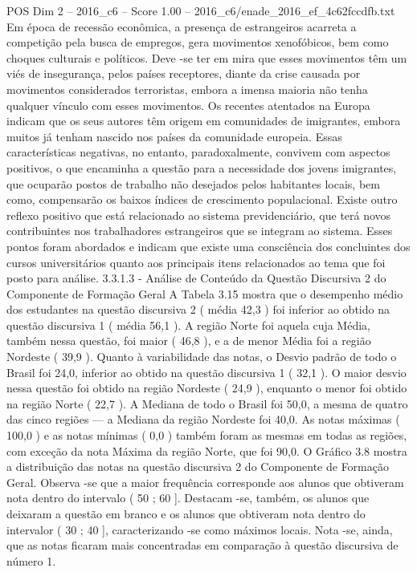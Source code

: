 \begin{textsample}{POS Dim 2 – 2016\_c6 – Score 1.00 – 2016\_c6/enade\_2016\_ef\_4c62fccdfb.txt}
Em época de recessão econômica, a presença de estrangeiros acarreta a competição pela busca de empregos, gera movimentos xenofóbicos, bem como choques culturais e políticos.
Deve -se ter em mira que esses movimentos têm um viés de insegurança, pelos países receptores, diante da crise causada por movimentos considerados terroristas, embora a imensa maioria não tenha qualquer vínculo com esses movimentos.
Os recentes atentados na Europa indicam que os seus autores têm origem em comunidades de imigrantes, embora muitos já tenham nascido nos países da comunidade europeia.
Essas características negativas, no entanto, paradoxalmente, convivem com aspectos positivos, o que encaminha a questão para a necessidade dos jovens imigrantes, que ocuparão postos de trabalho não desejados pelos habitantes locais, bem como, compensarão os baixos índices de crescimento populacional.
Existe outro reflexo positivo que está relacionado ao sistema previdenciário, que terá novos contribuintes nos trabalhadores estrangeiros que se integram ao sistema.
Esses pontos foram abordados e indicam que existe uma consciência dos concluintes dos cursos universitários quanto aos principais itens relacionados ao tema que foi posto para análise. 3.3.1.3 - Análise de Conteúdo da Questão Discursiva 2 do Componente de Formação Geral A Tabela 3.15 mostra que o desempenho médio dos estudantes na questão discursiva 2 ( média 42,3 ) foi inferior ao obtido na questão discursiva 1 ( média 56,1 ).
A região Norte foi aquela cuja Média, também nessa questão, foi maior ( 46,8 ), e a de menor Média foi a região Nordeste ( 39,9 ).
Quanto à variabilidade das notas, o Desvio padrão de todo o Brasil foi 24,0, inferior ao obtido na questão discursiva 1 ( 32,1 ).
O maior desvio nessa questão foi obtido na região Nordeste ( 24,9 ), enquanto o menor foi obtido na região Norte ( 22,7 ).
A Mediana de todo o Brasil foi 50,0, a mesma de quatro das cinco regiões — a Mediana da região Nordeste foi 40,0.
As notas máximas ( 100,0 ) e as notas mínimas ( 0,0 ) também foram as mesmas em todas as regiões, com exceção da nota Máxima da região Norte, que foi 90,0.
O Gráfico 3.8 mostra a distribuição das notas na questão discursiva 2 do Componente de Formação Geral.
Observa -se que a maior frequência corresponde aos alunos que obtiveram nota dentro do intervalo ( 50 ; 60 ].
Destacam -se, também, os alunos que deixaram a questão em branco e os alunos que obtiveram nota dentro do intervalor ( 30 ; 40 ], caracterizando -se como máximos locais.
Nota -se, ainda, que as notas ficaram mais concentradas em comparação à questão discursiva de número 1.

\end{textsample}
